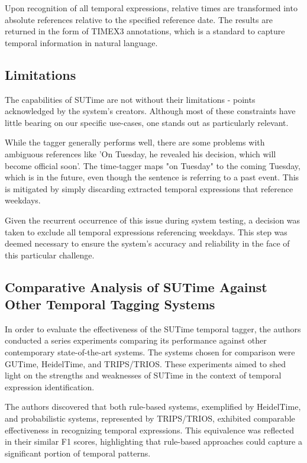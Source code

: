 \documentclass[a4paper,10pt]{report} %
\begin{document}
Upon recognition of all temporal expressions, relative times are transformed into absolute references relative to the specified reference date. The results are returned in the form of TIMEX3 annotations, which is a standard to capture temporal information in natural language.

\subsection{Limitations}
The capabilities of SUTime are not without their limitations - points acknowledged by the system's creators. Although most of these constraints have little bearing on our specific use-cases, one stands out as particularly relevant.

While the tagger generally performs well, there are some problems with ambiguous references like ’On Tuesday, he revealed his decision, which will become official soon’. The time-tagger maps "on Tuesday" to the coming Tuesday, which is in the future, even though the sentence is referring to a past event. This is mitigated by simply discarding extracted temporal expressions that reference weekdays.

Given the recurrent occurrence of this issue during system testing, a decision was taken to exclude all temporal expressions referencing weekdays. This step was deemed necessary to ensure the system's accuracy and reliability in the face of this particular challenge.

\subsection{Comparative Analysis of SUTime Against Other Temporal Tagging Systems}
In order to evaluate the effectiveness of the SUTime temporal tagger, the authors conducted a series experiments comparing its performance against other contemporary state-of-the-art systems. The systems chosen for comparison were GUTime, HeidelTime, and TRIPS/TRIOS. These experiments aimed to shed light on the strengths and weaknesses of SUTime in the context of temporal expression identification.

The authors discovered that both rule-based systems, exemplified by HeidelTime, and probabilistic systems, represented by TRIPS/TRIOS, exhibited comparable effectiveness in recognizing temporal expressions. This equivalence was reflected in their similar F1 scores, highlighting that rule-based approaches could capture a significant portion of temporal patterns.
\end{document}
